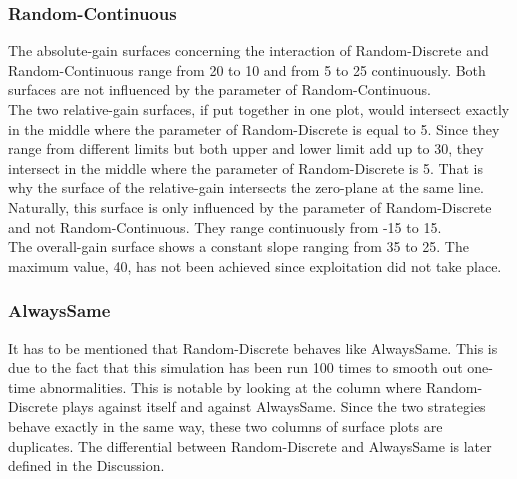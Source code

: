 \documentclass[11pt]{article}
\begin{document}
\subsubsection*{Random-Continuous}
		The absolute-gain surfaces concerning the interaction of Random-Discrete and Random-Continuous range from 20 to 10 and from 5 to 25 continuously.
		Both surfaces are not influenced by the parameter of Random-Continuous.\\

		The two relative-gain surfaces, if put together in one plot, would intersect exactly in the middle where the parameter of Random-Discrete is equal to 5.
		Since they range from different limits but both upper and lower limit add up to 30, they intersect in the middle where the parameter of Random-Discrete is 5.
		That is why the surface of the relative-gain intersects the zero-plane at the same line.
		Naturally, this surface is only influenced by the parameter of Random-Discrete and not Random-Continuous.
		They range continuously from -15 to 15.\\

		The overall-gain surface shows a constant slope ranging from 35 to 25.
		The maximum value, 40, has not been achieved since exploitation did not take place.\\


\subsubsection*{AlwaysSame}
		It has to be mentioned that Random-Discrete behaves like AlwaysSame.
		This is due to the fact that this simulation has been run 100 times to smooth out one-time abnormalities.
		This is notable by looking at the column where Random-Discrete plays against itself and against AlwaysSame.
		Since the two strategies behave exactly in the same way, these two columns of surface plots are duplicates.
		The differential between Random-Discrete and AlwaysSame is later defined in the Discussion.\\
\end{document}
